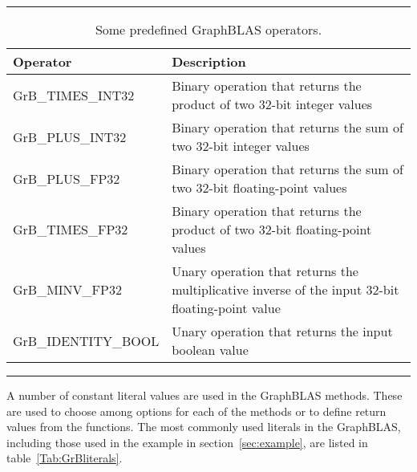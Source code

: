 \begin{table}[h]
\hrule
\begin{center}
\caption{Some predefined GraphBLAS operators.}
\label{Tab:GrBops}
\begin{tabular}{lp{5.25cm}}
Operator                       & Description  \\
\hline
	{\sf GrB\_TIMES\_INT32}    & Binary operation that returns the product of two 32-bit integer values \\
	{\sf GrB\_PLUS\_INT32}     & Binary operation that returns the sum of two 32-bit integer values \\
	{\sf GrB\_PLUS\_FP32}      & Binary operation that returns the sum of two 32-bit floating-point values \\
	{\sf GrB\_TIMES\_FP32}     & Binary operation that returns the product of two 32-bit floating-point values \\
	{\sf GrB\_MINV\_FP32}      & Unary operation that returns the multiplicative inverse of the input 32-bit floating-point value \\
	{\sf GrB\_IDENTITY\_BOOL}  & Unary operation that returns the input boolean value \\
\end{tabular}
\end{center}
\hrule
\end{table}
A number of constant literal values are used in the GraphBLAS methods.  These are used to 
choose among options for each of the methods or to define return values from the functions.
The most commonly used literals in the GraphBLAS, including those used in the example in 
section~\ref{sec:example}, are listed in table~\ref{Tab:GrBliterals}.

